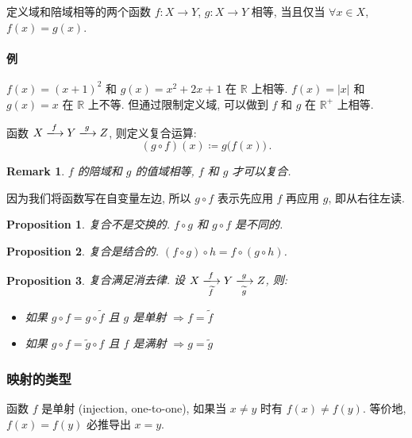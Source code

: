 \documentclass[UTF8]{ctexart}
\theoremstyle{mystyle}
\newtheorem{proposition}{Proposition}[section]
\theoremstyle{myremark}
\newtheorem*{remark}{Remark}
\theoremstyle{plain}
\newcommand{\R}{\mathbb R}
\begin{document}
\begin{definition}
    定义域和陪域相等的两个函数 $ f \colon X \to Y $, $ g: X \to Y $ 相等, 当且仅当 $ \forall x \in X $, $ f(x) = g(x) $.
\end{definition}

\paragraph{例}
$ f(x) = (x + 1)^2 $ 和 $ g(x) = x^2 + 2 x + 1 $ 在 $ \R $ 上相等. $ f(x) = |x| $ 和 $ g(x) = x $ 在 $ \R $ 上不等. 但通过限制定义域, 可以做到 $ f $ 和 $ g $ 在 $ \R^+ $ 上相等.

\begin{definition}
    函数 $ X \xlongrightarrow{f} Y \xlongrightarrow{g} Z $, 则定义复合运算: \[ (g \circ f)(x) \coloneqq g \big( f(x) \big) \,.\]
\end{definition}

\begin{remark}
    $ f $ 的陪域和 $ g $ 的值域相等, $ f $ 和 $ g $ 才可以复合.
\end{remark}

因为我们将函数写在自变量左边, 所以 $ g \circ f $ 表示先应用 $ f $ 再应用 $ g $, 即从右往左读.

\begin{proposition}
    复合不是交换的. $ f \circ g $ 和 $ g \circ f $ 是不同的.
\end{proposition}

\begin{proposition}
    复合是结合的. $ (f \circ g) \circ h = f \circ (g \circ h) $.
\end{proposition}

\begin{proposition}
    复合满足消去律. 设 $ X \xlongrightarrow[\widetilde f]{f} Y \xlongrightarrow[\widetilde g]{g} Z $, 则:
    \begin{itemize}
        \item 如果 $ g \circ f = g \circ \widetilde{f} $ 且 $ g $ 是单射 $ \Longrightarrow f = \widetilde{f} $
        \item 如果 $ g \circ f = \widetilde{g} \circ f $ 且 $ f $ 是满射 $ \Longrightarrow g = \widetilde{g} $
    \end{itemize}
\end{proposition}

\subsubsection{映射的类型}
\begin{definition}[\text{单射/1 对 1}]
    函数 $ f $ 是单射 (injection, one-to-one), 如果当 $ x \neq y $ 时有 $ f(x) \neq f(y) $. 等价地, $ f(x) = f(y) $ 必推导出 $ x = y $.
\end{definition}
\end{document}
